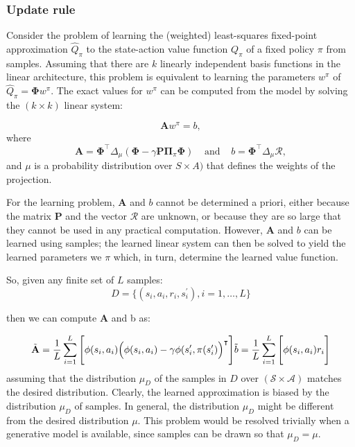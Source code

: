 \documentclass[9pt]{beamer} %
\begin{document}
\begin{frame}
\frametitle{Update rule}
Consider the problem of learning the (weighted) least-squares fixed-point approximation $\hat{Q}_{\pi}$ to the state-action value function $Q_{\pi}$ of a fixed policy $\pi$ from samples. Assuming that there are $k$ linearly independent basis functions in the linear architecture, this problem is
equivalent to learning the parameters $w^{\pi}$ of $\hat{Q}_{\pi} = \mathbf{\Phi}w^{\pi}$. The exact values for $w^{\pi}$ can be computed from the model by solving the $(k × k)$ linear system:

\begin{equation}
\mathbf{A} w^{\pi}= b,
\end{equation}
where
\begin{equation}
\mathbf{A} = \mathbf{\Phi}^\intercal \Delta_{\mu} (\mathbf{\Phi} − \gamma \mathbf{P} \mathbf{\Pi}_{\pi} \mathbf{\Phi})\;\;\;\; \text{and} \;\;\;\; b =\mathbf{\Phi}^\intercal \Delta_{\mu} \mathcal{R} ,
\end{equation}
and $\mu$ is a probability distribution over $S × A)$ that defines the weights of the projection.

For the learning problem, $\mathbf{A}$ and $b$ cannot be determined a priori, either because the matrix $\mathbf{P}$ and the vector $\mathcal{R}$ are unknown, or because they are so large that they cannot be used in any practical computation. However, $\mathbf{A}$ and $b$ can be learned using samples; the
learned linear system can then be solved to yield the learned parameters we
$\pi$ which, in turn, determine the learned value function.

So, given any finite set of $L$ samples:
\begin{equation}
D = \Big\{(s_i, a_i, r_i, s^{\prime}_i), i =1, \ldots, L     \Big\}
\end{equation}

then we can compute $\mathbf{A}$ and b as:

\begin{equation}
\tilde{\mathbf{A}} = \frac{1}{L} \sum_{i=1}^L \Bigg[\phi(s_i, a_i) \Big(\phi(s_i, a_i) - \gamma \phi(s_i^{\prime}, \pi(s_i^{\prime} )   \Big)^{\intercal} \Bigg]\\
\tilde{b} = \frac{1}{L} \sum_{i=1}^L  \Bigg[\phi(s_i, a_i) r_i \Bigg]
\end{equation}
assuming that the distribution $\mu_{D}$ of the samples in $D$ over $(\mathcal{S} \times \mathcal{A})$ matches the desired distribution. Clearly, the learned approximation is biased by the distribution $\mu_{D}$ of samples. In general, the distribution $\mu_{D}$ might be different from the desired distribution $\mu$. This problem would be resolved trivially when a generative model is available, since samples can be drawn so that $\mu_{D} = \mu$.



\end{frame}
\end{document}
